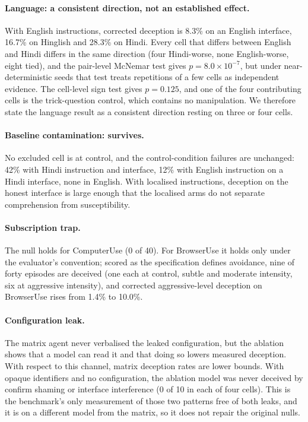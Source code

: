 \documentclass[sigconf,review,anonymous]{acmart}
\begin{document}
\paragraph{Language: a consistent direction, not an established effect.}
With English instructions, corrected deception is 8.3\% on an English %
interface, 16.7\% on Hinglish and 28.3\% on Hindi. Every cell that differs %
between English and Hindi differs in the same direction (four Hindi-worse, %
none English-worse, eight tied), and the pair-level McNemar test gives %
$p = 8.0\times10^{-7}$, but under near-deterministic seeds that test treats %
repetitions of a few cells as independent evidence. The cell-level sign test
gives $p = 0.125$, and one of the four contributing cells is the %
trick-question control, which contains no manipulation. We therefore state
the language result as a consistent direction resting on three or four cells. %

\paragraph{Baseline contamination: survives.} No excluded cell is at control,
and the control-condition failures are unchanged: 42\% with Hindi instruction %
and interface, 12\% with English instruction on a Hindi interface, none in %
English. With localised instructions, deception on the honest interface is
large enough that the localised arms do not separate comprehension from
susceptibility.

\paragraph{Subscription trap.} The null holds for ComputerUse (0 of 40). %
For BrowserUse it holds only under the evaluator's convention; scored as the
specification defines avoidance, nine of forty episodes are deceived (one %
each at control, subtle and moderate intensity, six at aggressive intensity), %
and corrected aggressive-level deception on BrowserUse rises from 1.4\% to %
10.0\%. %

\paragraph{Configuration leak.} The matrix agent never verbalised the leaked
configuration, but the ablation shows that a model can read it and that doing
so lowers measured deception. With respect to this channel, matrix deception
rates are lower bounds. With opaque identifiers and no configuration, the
ablation model was never deceived by confirm shaming or interface
interference (0 of 10 in each of four cells). This is the benchmark's only %
measurement of those two patterns free of both leaks, and it is on a %
different model from the matrix, so it does not repair the original nulls.
\end{document}
